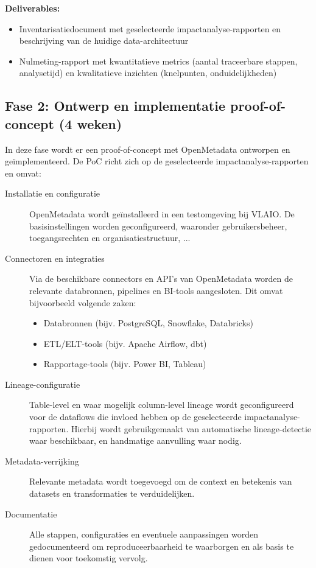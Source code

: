 \textbf{Deliverables:}
\begin{itemize}
    \item Inventarisatiedocument met geselecteerde impactanalyse-rapporten en beschrijving van de huidige data-architectuur
    \item Nulmeting-rapport met kwantitatieve metrics (aantal traceerbare stappen, analysetijd) en kwalitatieve inzichten (knelpunten, onduidelijkheden)
\end{itemize}

\subsection{Fase 2: Ontwerp en implementatie proof-of-concept (4 weken)}
In deze fase wordt er een proof-of-concept met OpenMetadata ontworpen en geïmplementeerd. De PoC richt zich op de geselecteerde impactanalyse-rapporten en omvat:

\begin{description}
    \item[Installatie en configuratie] OpenMetadata wordt geïnstalleerd in een testomgeving bij VLAIO. De basisinstellingen worden geconfigureerd, waaronder gebruikersbeheer, toegangsrechten en organisatiestructuur, ...

    \item[Connectoren en integraties] Via de beschikbare connectors en API's van OpenMetadata worden de relevante databronnen, pipelines en BI-tools aangesloten. Dit omvat bijvoorbeeld volgende zaken:
    \begin{itemize}
        \item Databronnen (bijv. PostgreSQL, Snowflake, Databricks)
        \item ETL/ELT-tools (bijv. Apache Airflow, dbt)
        \item Rapportage-tools (bijv. Power BI, Tableau)
    \end{itemize}

    \item[Lineage-configuratie] Table-level en waar mogelijk column-level lineage wordt geconfigureerd voor de dataflows die invloed hebben op de geselecteerde impactanalyse-rapporten. Hierbij wordt gebruikgemaakt van automatische lineage-detectie waar beschikbaar, en handmatige aanvulling waar nodig.
    \item[Metadata-verrijking] Relevante metadata wordt toegevoegd om de context en betekenis van datasets en transformaties te verduidelijken.
    \item[Documentatie] Alle stappen, configuraties en eventuele aanpassingen worden gedocumenteerd om reproduceerbaarheid te waarborgen en als basis te dienen voor toekomstig vervolg.
\end{description}

